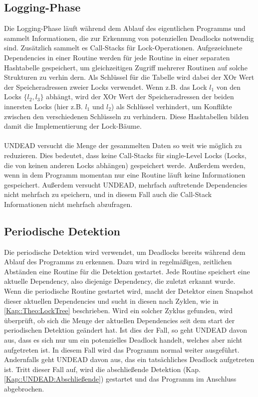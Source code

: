 \subsection{Logging-Phase}
Die Logging-Phase läuft während dem Ablauf des eigentlichen Programms und sammelt
Informationen, die zur Erkennung von potenziellen Deadlocks notwendig sind. 
Zusätzlich sammelt es Call-Stacks für Lock-Operationen. Aufgezeichnete 
Dependencies in einer Routine werden für jede Routine in einer separaten 
Hashtabelle gespeichert, um gleichzeitigen Zugriff mehrerer Routinen auf solche 
Strukturen zu verhin
dern. Als Schlüssel für die Tabelle wird dabei der XOr 
Wert der Speicheradressen zweier Locks verwendet. Wenn z.B. das Lock $l_1$ 
von den Locks $\{l_2, l_3\}$ abhängt, wird der XOr Wert der Speicheradressen der 
beiden innersten Locks (hier z.B. $l_1$ und $l_2$) als Schlüssel verhindert, um 
Konflikte zwischen den verschiedenen Schlüsseln zu verhindern. Diese 
Hashtabellen bilden damit die Implementierung der Lock-Bäume.\\\\
UNDEAD versucht die Menge der gesammelten Daten so weit wie möglich zu reduzieren.
Dies bedeutet, dass keine Call-Stacks für single-Level Locks (Locks, die von 
keinen anderen Locks abhängen) gespeichert werde.
Außerdem werden, wenn in dem Programm momentan nur eine Routine läuft keine 
Informationen gespeichert. Außerdem versucht UNDEAD, mehrfach auftretende
Dependencies nicht mehrfach zu speichern, und in diesem Fall auch die Call-Stack
Informationen nicht mehrfach abzufragen.
\subsection{Periodische Detektion}
Die periodische Detektion wird verwendet, um Deadlocks bereits während dem 
Ablauf des Programms zu erkennen. Dazu wird in regelmäßigen, zeitlichen 
Abständen eine Routine für die Detektion gestartet. Jede Routine speichert eine 
aktuelle Dependency, also diejenige Dependency, die zuletzt erkannt wurde.\\
Wenn die periodische Routine gestartet wird, macht der Detektor einen Snapshot
dieser aktuellen Dependencies und sucht in diesen nach Zyklen, wie in 
\ref{Kap::Theo:LockTree} beschrieben. Wird ein solcher Zyklus gefunden, wird 
überprüft, ob sich die Menge der aktuellen Dependencies seit dem start der 
periodischen Detektion geändert hat. Ist dies der Fall, so geht UNDEAD davon aus,
dass es sich nur um ein potenzielles Deadlock handelt, welches aber nicht 
aufgetreten ist. In diesem Fall wird das Programm normal weiter ausgeführt.
Andernfalls geht UNDEAD davon aus, das ein tatsächliches Deadlock aufgetreten 
ist. Tritt dieser Fall auf, wird die 
abschließende Detektion (Kap. \ref{Kap::UNDEAD:Abschließende}) gestartet 
und das Programm im Anschluss abgebrochen. 

